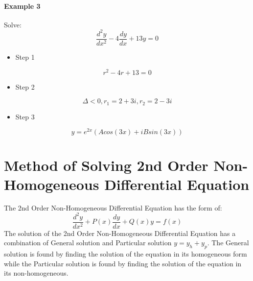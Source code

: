 \paragraph{Example 3} Solve:
\[
\frac{d^2y}{dx^2} -4\frac{dy}{dx} + 13 y = 0
\]
\begin{itemize}
	\item Step 1
\end{itemize}
\[
r^2 -4r + 13 =0
\]
\begin{itemize}
	\item Step 2
\end{itemize}
\[
\Delta < 0, r_1 = 2+3i, r_2 = 2-3i
\]
\begin{itemize}
	\item Step 3
\end{itemize}
\[
y = e^{2 x}(A cos (3 x) + iB sin (3 x))
\]




\section{Method of Solving 2nd Order Non-Homogeneous Differential Equation}
The 2nd Order Non-Homogeneous Differential Equation has the form of:
\[
\frac{d^2y}{dx^2} + P(x)\frac{dy}{dx} + Q(x) y = f(x)
\]
The solution of the 2nd Order Non-Homogeneous Differential Equation has a combination of General solution and Particular solution \(y = y_h + y_p\). The General solution is found by finding the solution of the equation in its homogeneous form while the Particular solution is found by finding the solution of the equation in its non-homogeneous.

